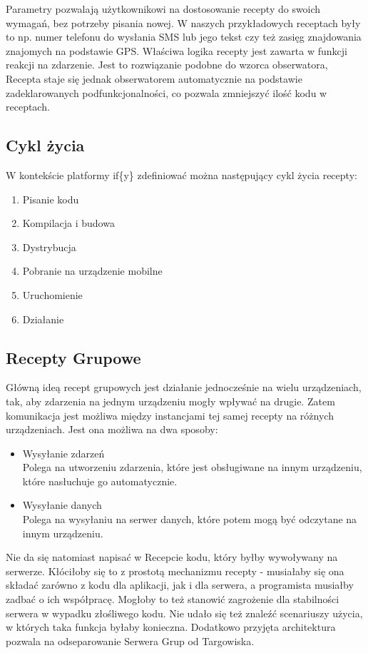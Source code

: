 \documentclass[11pt,a4paper,polish,thesis]{dcsbook}
\begin{document}
Parametry pozwalają użytkownikowi na dostosowanie recepty do swoich wymagań, bez potrzeby pisania nowej. W naszych przykładowych receptach były to np. numer telefonu do wysłania SMS lub jego tekst czy też zasięg znajdowania znajomych na podstawie GPS.
Właściwa logika recepty jest zawarta w funkcji reakcji na zdarzenie. Jest to rozwiązanie podobne do wzorca obserwatora, Recepta staje się jednak obserwatorem automatycznie na podstawie zadeklarowanych podfunkcjonalności, co pozwala zmniejszyć ilość kodu w receptach.

\subsection{Cykl życia}
W kontekście platformy if\{y\} zdefiniować można następujący cykl życia recepty:
\begin{enumerate}
\item Pisanie kodu
\item Kompilacja i budowa
\item Dystrybucja
\item Pobranie na urządzenie mobilne
\item Uruchomienie
\item Działanie
\end{enumerate}

\subsection{Recepty Grupowe}
Główną ideą recept grupowych jest działanie jednocześnie na wielu urządzeniach, tak, aby zdarzenia na jednym urządzeniu mogły wpływać na drugie. Zatem komunikacja jest możliwa między instancjami  tej samej recepty na różnych urządzeniach. Jest ona możliwa na dwa sposoby:
\begin{itemize}
\item{Wysyłanie zdarzeń}\\
Polega na utworzeniu zdarzenia, które jest obsługiwane na innym urządzeniu, które nasłuchuje go automatycznie.
\item{Wysyłanie danych}\\
Polega na wysyłaniu na serwer danych, które potem mogą być odczytane na innym urządzeniu.
\end{itemize}
Nie da się natomiast napisać w Recepcie kodu, który byłby wywoływany na serwerze. Kłóciłoby się to z prostotą mechanizmu recepty - musiałaby się ona składać zarówno z kodu dla aplikacji, jak i dla serwera, a programista musiałby zadbać o ich współpracę. Mogłoby to też stanowić zagrożenie dla stabilności serwera w wypadku złośliwego kodu.
Nie udało się też znaleźć scenariuszy użycia, w których taka funkcja byłaby konieczna. Dodatkowo przyjęta architektura pozwala na odseparowanie Serwera Grup od Targowiska. 
\end{document}

